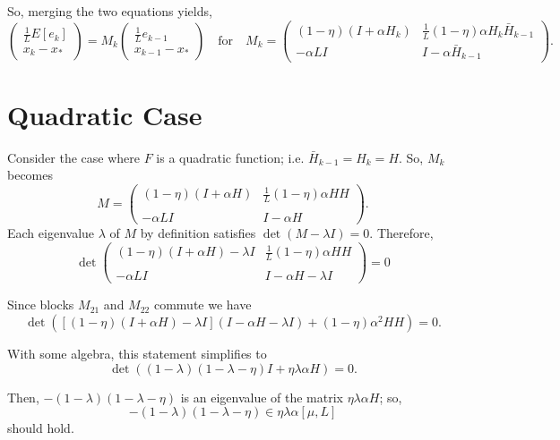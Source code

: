 \documentclass{article}
\begin{document}
\bigskip

\noindent  
So, merging the two equations yields,
\[
 \begin{pmatrix} \displaystyle\frac{1}{L}E[e_k] \\ x_k-x_\ast \end{pmatrix} 
= M_k
 \begin{pmatrix} \displaystyle\frac{1}{L}e_{k-1} \\ x_{k-1}-x_\ast \end{pmatrix}  \quad\mbox{for}\quad 
 M_k = \begin{pmatrix} (1-\eta)(I+\alpha H_k) & \displaystyle\frac{1}{L} (1-\eta)\alpha H_k\bar H_{k-1}\\  
                   -\alpha LI  & I-\alpha\bar H_{k-1} \end{pmatrix}.                   
\]

\bigskip\bigskip

\section{Quadratic Case}

Consider the case where $F$ is a quadratic function; i.e. $\bar H_{k-1}=H_k=H$.  So, $M_k$ becomes
\[
M = \begin{pmatrix} (1-\eta)(I+\alpha H) & \displaystyle\frac{1}{L}(1-\eta) \alpha HH\\ 
 \\
                   -\alpha LI  & I-\alpha H \end{pmatrix}.                  
\]
Each eigenvalue $\lambda$ of $M$ by definition satisfies $\det(M-\lambda I)=0$.  Therefore,
\[
 \det \begin{pmatrix} (1-\eta)(I+\alpha H)-\lambda I & \displaystyle\frac{1}{L}(1-\eta) \alpha HH\\ 
 \\
                    -\alpha LI   & I-\alpha H -\lambda I  \end{pmatrix}=0
\]

Since blocks $M_{21}$ and $M_{22}$ commute we have
\[
 \det\left(\left[(1-\eta)(I+\alpha H)-\lambda I\right](I-\alpha H -\lambda I) + (1-\eta)\alpha^2 HH \right)=0.
\]

With some algebra, this statement simplifies to 
\[
 \det\left((1-\lambda)(1-\lambda-\eta)I + \eta \lambda \alpha H \right)=0.
\]

Then, $-(1-\lambda)(1-\lambda-\eta)$ is an eigenvalue of the matrix $\eta \lambda \alpha H$; so,
\begin{equation}
 -(1-\lambda)(1-\lambda-\eta) \in \eta \lambda \alpha \left[\mu,L\right]
 \label{eq:p}
\end{equation}
should hold.
\end{document}
